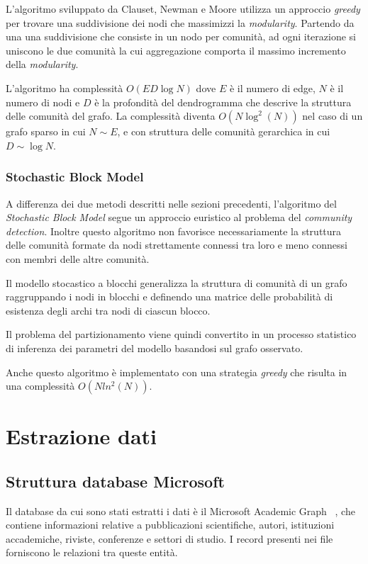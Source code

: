\documentclass[12pt,a4paper,twoside]{report}
\begin{document}
L'algoritmo sviluppato da Clauset, Newman e Moore utilizza un approccio \textit{greedy} per trovare
una suddivisione dei nodi che massimizzi la \textit{modularity}. Partendo da una una suddivisione
che consiste in un nodo per comunità, ad ogni iterazione si uniscono le due comunità la cui
aggregazione comporta il massimo incremento della \textit{modularity}.

L'algoritmo ha complessità $O(ED\log N)$ dove $E$ è il numero di edge, $N$ è il numero di nodi e $D$
è la profondità del dendrogramma che descrive la struttura delle comunità del grafo. La complessità
diventa $O(N\log^{2}(N))$ nel caso di un grafo sparso in cui $N\sim E$, e con struttura delle
comunità gerarchica in cui $D\sim\log N$.

\subsection{Stochastic Block Model} \label{subsec:bn}

A differenza dei due metodi descritti nelle sezioni precedenti, l'algoritmo del \textit{Stochastic
Block Model} segue un approccio euristico al problema del \textit{community detection}.
Inoltre questo algoritmo non favorisce necessariamente la struttura delle comunità formate da nodi
strettamente connessi tra loro e meno connessi con membri delle altre comunità.

Il modello stocastico a blocchi generalizza la struttura di comunità di un grafo raggruppando i nodi
in blocchi e definendo una matrice delle probabilità di esistenza degli archi tra nodi di ciascun
blocco.

Il problema del partizionamento viene quindi convertito in un processo statistico di inferenza dei
parametri del modello basandosi sul grafo osservato.

Anche questo algoritmo è implementato con una strategia \textit{greedy} che risulta in una
complessità $O(N ln^2(N))$.

\whitePage
\chapter{Estrazione dati} \label{cap:estrazione}

\section{Struttura database Microsoft} \label{sec:msr}
Il database da cui sono stati estratti i dati è il Microsoft Academic Graph~
\cite{Sinha:2015:OMA:2740908.2742839}, che contiene informazioni relative a pubblicazioni
scientifiche, autori, istituzioni accademiche, riviste, conferenze e settori di studio. I record
presenti nei file forniscono le relazioni tra queste entità.
\end{document}
